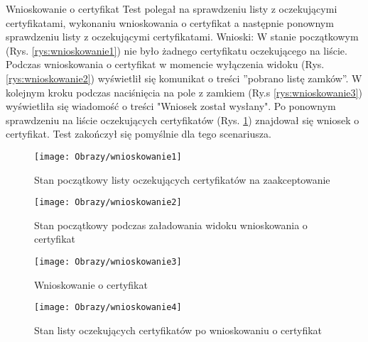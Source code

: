 \begin{enumerate*}
	\newpage

	\item Wnioskowanie o certyfikat\newline
	Test polegał na sprawdzeniu listy z oczekującymi certyfikatami, wykonaniu wnioskowania o certyfikat a następnie ponownym sprawdzeniu listy z oczekującymi certyfikatami.
	Wnioski: W stanie początkowym (Rys. \ref{rys:wnioskowanie1}) nie było żadnego certyfikatu oczekującego na liście. Podczas wnioskowania o certyfikat w momencie wyłączenia widoku (Rys. \ref{rys:wnioskowanie2}) wyświetlił się  komunikat o treści ''pobrano listę zamków''. W kolejnym kroku podczas naciśnięcia na pole z zamkiem (Ry.s \ref{rys:wnioskowanie3}) wyświetliła się wiadomość o treści "Wniosek został wysłany". Po ponownym sprawdzeniu na liście oczekujących certyfikatów (Rys. \ref{rys:wnioskowanie4}) znajdował się wniosek o certyfikat. Test zakończył się pomyślnie dla tego scenariusza.
	\begin{figure}[ht!]
		\centering
		\begin{minipage}{0.3\textwidth}
			\texttt{[image: Obrazy/wnioskowanie1]}
			\caption{Stan początkowy listy oczekujących certyfikatów na zaakceptowanie }
			\label{rys:wnioskowanie1}
		\end{minipage}
		\begin{minipage}{0.3\textwidth}
			\texttt{[image: Obrazy/wnioskowanie2]}
			\caption{Stan początkowy podczas załadowania widoku wnioskowania o certyfikat}
			\label{rys:wnioskowanie2}
		\end{minipage}
	
		\begin{minipage}{0.3\textwidth}
		\texttt{[image: Obrazy/wnioskowanie3]}
		\caption{Wnioskowanie o certyfikat}
		\label{rys:wnioskowanie3}
	\end{minipage}
\hspace{0.01\textwidth}
	\begin{minipage}{0.3\textwidth}
		\texttt{[image: Obrazy/wnioskowanie4]}
		\caption{Stan listy oczekujących certyfikatów po wnioskowaniu o certyfikat}
		\label{rys:wnioskowanie4}
	\end{minipage}
	\end{figure}


\end{enumerate*}
